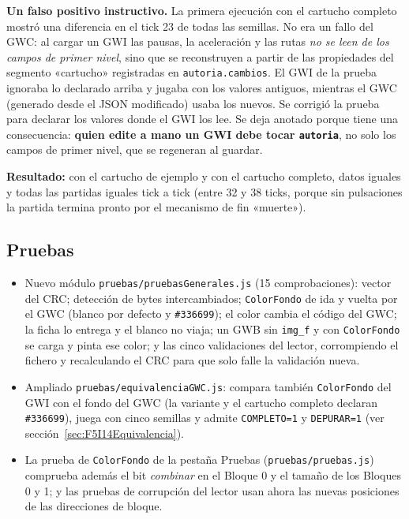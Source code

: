 \textbf{Un falso positivo instructivo.} La primera ejecución con el cartucho completo mostró una diferencia en el tick 23 de todas las semillas. No era un fallo del GWC: al cargar un GWI las pausas, la aceleración y las rutas \emph{no se leen de los campos de primer nivel}, sino que se reconstruyen a partir de las propiedades del segmento «cartucho» registradas en \texttt{autoria.cambios}. El GWI de la prueba ignoraba lo declarado arriba y jugaba con los valores antiguos, mientras el GWC (generado desde el JSON modificado) usaba los nuevos. Se corrigió la prueba para declarar los valores donde el GWI los lee. Se deja anotado porque tiene una consecuencia: \textbf{quien edite a mano un GWI debe tocar \texttt{autoria}}, no solo los campos de primer nivel, que se regeneran al guardar.

\textbf{Resultado:} con el cartucho de ejemplo y con el cartucho completo, datos iguales y todas las partidas iguales tick a tick (entre 32 y 38 ticks, porque sin pulsaciones la partida termina pronto por el mecanismo de fin «muerte»).

\subsection{Pruebas}
\label{sec:F5I14Pruebas}

\begin{itemize}
	\item Nuevo módulo \texttt{pruebas/pruebasGenerales.js} (15 comprobaciones): vector del CRC; detección de bytes intercambiados; \texttt{ColorFondo} de ida y vuelta por el GWC (blanco por defecto y \texttt{\#336699}); el color cambia el código del GWC; la ficha lo entrega y el blanco no viaja; un GWB sin \texttt{img\_f} y con \texttt{ColorFondo} se carga y pinta ese color; y las cinco validaciones del lector, corrompiendo el fichero y recalculando el CRC para que solo falle la validación nueva.
	
	\item Ampliado \texttt{pruebas/equivalenciaGWC.js}: compara también \texttt{ColorFondo} del GWI con el fondo del GWC (la variante y el cartucho completo declaran \texttt{\#336699}), juega con cinco semillas y admite \texttt{COMPLETO=1} y \texttt{DEPURAR=1} (ver sección~\ref{sec:F5I14Equivalencia}).

	\item La prueba de \texttt{ColorFondo} de la pestaña Pruebas (\texttt{pruebas/pruebas.js}) comprueba además el bit \emph{combinar} en el Bloque 0 y el tamaño de los Bloques 0 y 1; y las pruebas de corrupción del lector usan ahora las nuevas posiciones de las direcciones de bloque.
\end{itemize}

